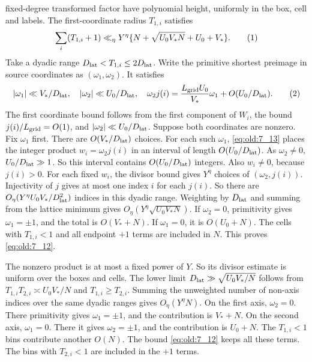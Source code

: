 fixed-degree transformed factor have polynomial height, uniformly in the
box, cell and labels. The first-coordinate radius \(T_{1,i}\) satisfies
\[
 \sum_i(T_{1,i}+1)\ll_\eta
 Y^\eta\{N+\sqrt{U_0V_*N}+U_0+V_*\}.
\AutoTag{eq:old:7_12}
\]
Take a dyadic range \(D_{\rm lat}<T_{1,i}\le
2D_{\rm lat}\). Write the primitive shortest preimage in source
coordinates as \((\omega_1,\omega_2)\). It satisfies
\[
 |\omega_1|\ll V_*/D_{\rm lat},\quad |\omega_2|\ll U_0/D_{\rm lat},\quad
 \omega_2j(i)=\frac{L_{\rm grid}U_0}{V_*}\omega_1+O(U_0/D_{\rm lat}).
\AutoTag{eq:old:7_13}
\]
The first coordinate bound follows from the first component of \(W_i\),
the bound \(j(i)/L_{\rm grid}=O(1)\), and
\(|\omega_2|\ll U_0/D_{\rm lat}\). Suppose both coordinates are nonzero.
Fix \(\omega_1\) first. There are \(O(V_*/D_{\rm lat})\) choices. For each such
\(\omega_1\), \eqref{eq:old:7_13} places the integer product
\(w_i=\omega_2j(i)\) in an interval
of length \(O(U_0/D_{\rm lat})\). As \(\omega_2\ne0\),
\(U_0/D_{\rm lat}\gg1\). So this interval contains
\(O(U_0/D_{\rm lat})\) integers. Also \(w_i\ne0\), because
\(j(i)>0\).
For each fixed \(w_i\), the divisor bound gives \(Y^\eta\) choices of
\((\omega_2,j(i))\). Injectivity of \(j\) gives at most one index \(i\) for
each \(j(i)\). So there are
\(O_\eta(Y^\eta U_0V_*/D_{\rm lat}^2)\) indices in this dyadic range.
Weighting by \(D_{\rm lat}\) and summing from the lattice minimum gives
\(O_\eta(Y^\eta\sqrt{U_0V_*N})\). If \(\omega_2=0\),
primitivity gives
\(\omega_1=\pm1\), and the total is \(O(V_*+N)\). If \(\omega_1=0\), it is
\(O(U_0+N)\). The cells with \(T_{1,i}<1\) and all endpoint \(+1\)
terms are included in \(N\). This proves \eqref{eq:old:7_12}.

The nonzero product is at most a fixed power of \(Y\).
So its divisor estimate is uniform over the boxes and cells. The lower
limit \(D_{\rm lat}\gg\sqrt{U_0V_*/N}\) follows from
\(T_{1,i}T_{2,i}\asymp U_0V_*/N\) and \(T_{1,i}\ge T_{2,i}\).
Summing the unweighted number of non-axis indices over the same dyadic
ranges gives \(O_\eta(Y^\eta N)\). On the first axis, \(\omega_2=0\).
There primitivity gives \(\omega_1=\pm1\), and the contribution is
\(V_*+N\). On
the second axis, \(\omega_1=0\). There it gives \(\omega_2=\pm1\), and the
contribution is \(U_0+N\). The \(T_{1,i}<1\) bins contribute another
\(O(N)\). The bound \eqref{eq:old:7_12} keeps all these terms.
The bins with \(T_{2,i}<1\) are included in the \(+1\) terms.


